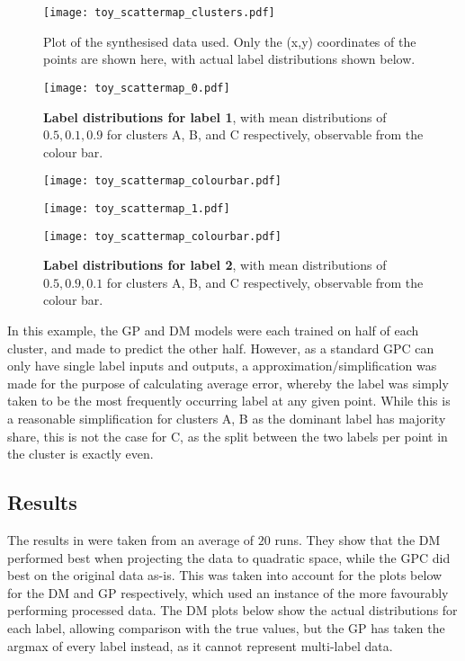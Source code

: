 \begin{figure}[H]
    \centerline{\texttt{[image: toy\_scattermap\_clusters.pdf]}}
    \caption{Plot of the synthesised data used. Only the {(x,y)} coordinates of the points are shown here, with actual label distributions shown below.}
    \label{fig:dm_toyplot}
\end{figure}

\begin{figure}[H]
    \centering
    \begin{minipage}{0.85\linewidth}
        \texttt{[image: toy\_scattermap\_0.pdf]}
        \caption*{\textbf{Label distributions for label 1}, with mean distributions of $0.5, 0.1, 0.9$ for clusters A, B, and C respectively, observable from the colour bar.}
    \end{minipage}
    \begin{minipage}{0.09\linewidth}
        \texttt{[image: toy\_scattermap\_colourbar.pdf]}
    \end{minipage}
    \begin{minipage}{0.85\linewidth}
        \texttt{[image: toy\_scattermap\_1.pdf]}
        \caption*{\textbf{Label distributions for label 2}, with mean distributions of $0.5, 0.9, 0.1$ for clusters A, B, and C respectively, observable from the colour bar.}
    \end{minipage}
    \begin{minipage}{0.09\linewidth}
        \texttt{[image: toy\_scattermap\_colourbar.pdf]}
    \end{minipage}
\end{figure}


In this example, the GP and DM models were each trained on half of each cluster, and made to predict the other half. However, as a standard GPC can only have single label inputs and outputs, a approximation/simplification was made for the purpose of calculating average error, whereby the label was simply taken to be the most frequently occurring label at any given point. While this is a reasonable simplification for clusters A, B as the dominant label has majority share, this is not the case for C, as the split between the two labels per point in the cluster is exactly even. 

\subsection{Results}

The results in  were taken from an average of $20$ runs. They show that the DM performed best when projecting the data to quadratic space, while the GPC did best on the original data as-is. This was taken into account for the plots below for the DM and GP respectively, which used an instance of the more favourably performing processed data. The DM plots below show the actual distributions for each label, allowing comparison with the true values, but the GP has taken the argmax of every label instead, as it cannot represent multi-label data.

